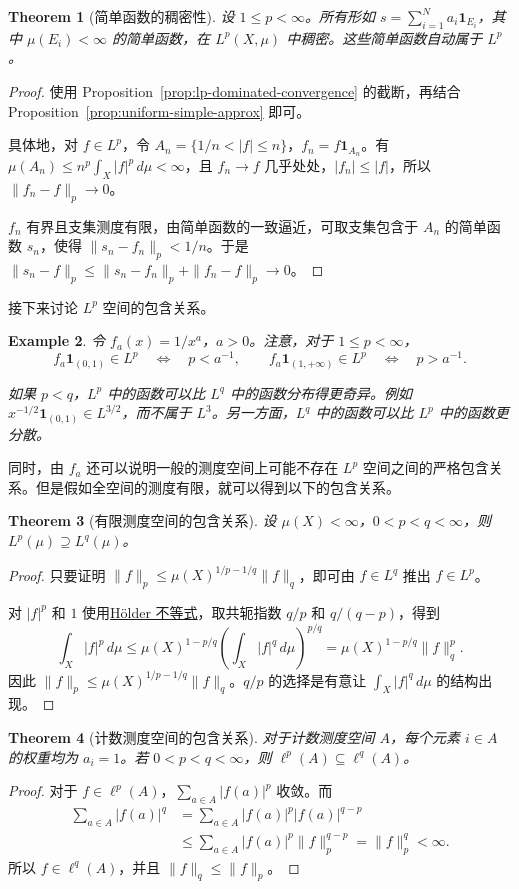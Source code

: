 \documentclass[12pt,letterpaper,twoside,openright]{ctexbook}
\theoremstyle{bluehead}
\newtheorem{theorem}{Theorem}
\theoremstyle{olivehead}
\theoremstyle{orangehead}
\newtheorem{example}[theorem]{Example}
\theoremstyle{redremark}
\begin{document}
\begin{theorem}[简单函数的稠密性]\label{thm:simple-functions-lp-density}
设 $1\leq p<\infty$。所有形如 $s=\sum_{i=1}^Na_i\mathbf1_{E_i}$，其中 $\mu(E_i)<\infty$ 的简单函数，在 $L^p(X,\mu)$ 中稠密。这些简单函数自动属于 $L^p$。
\end{theorem}
\begin{proof}
使用 Proposition~\ref{prop:lp-dominated-convergence} 的截断，再结合 Proposition~\ref{prop:uniform-simple-approx} 即可。

具体地，对 $f\in L^p$，令 $A_n=\{1/n<|f|\leq n\}$，$f_n=f\mathbf1_{A_n}$。有 $\mu(A_n)\leq n^p\int_X|f|^p\,d\mu<\infty$，且 $f_n\to f$ 几乎处处，$|f_n|\leq|f|$，所以 $\|f_n-f\|_p\to0$。

$f_n$ 有界且支集测度有限，由简单函数的一致逼近，可取支集包含于 $A_n$ 的简单函数 $s_n$，使得 $\|s_n-f_n\|_p<1/n$。于是 $\|s_n-f\|_p\leq\|s_n-f_n\|_p+\|f_n-f\|_p\to0$。
\end{proof}

\noindent 接下来讨论 $L^p$ 空间的包含关系。
\begin{example}
令 $f_a(x)=1/x^a$，$a>0$。注意，对于 $1\leq p<\infty$，
\[
f_a\mathbf1_{(0,1)}\in L^p
\quad\Longleftrightarrow\quad p<a^{-1},
\qquad
f_a\mathbf1_{(1,+\infty)}\in L^p
\quad\Longleftrightarrow\quad p>a^{-1}.
\]


如果 $p<q$，$L^p$ 中的函数可以比 $L^q$ 中的函数分布得更奇异。例如 $x^{-1/2}\mathbf1_{(0,1)}\in L^{3/2}$，而不属于 $L^3$。另一方面，$L^q$ 中的函数可以比 $L^p$ 中的函数更分散。
\end{example}
同时，由 $f_a$ 还可以说明一般的测度空间上可能不存在 $L^p$ 空间之间的严格包含关系。但是假如全空间的测度有限，就可以得到以下的包含关系。
\begin{theorem}[有限测度空间的包含关系]
设 $\mu(X)<\infty$，$0<p<q<\infty$，则 $L^p(\mu)\supseteq L^q(\mu)$。
\end{theorem}
\begin{proof}
只要证明 $\|f\|_p\leq\mu(X)^{1/p-1/q}\|f\|_q$，即可由 $f\in L^q$ 推出 $f\in L^p$。

对 $|f|^p$ 和 $1$ 使用\hyperref[thm:holder-lp]{Hölder 不等式}，取共轭指数 $q/p$ 和 $q/(q-p)$，得到
\[
\int_X|f|^p\,d\mu
\leq\mu(X)^{1-p/q}\left(\int_X|f|^q\,d\mu\right)^{p/q}
=\mu(X)^{1-p/q}\|f\|_q^p.
\]
因此 $\|f\|_p\leq\mu(X)^{1/p-1/q}\|f\|_q$。$q/p$ 的选择是有意让 $\int_X|f|^q\,d\mu$ 的结构出现。
\end{proof}

\begin{theorem}[计数测度空间的包含关系]
对于计数测度空间 $A$，每个元素 $i\in A$ 的权重均为 $a_i=1$。若 $0<p<q<\infty$，则 $\ell^p(A)\subseteq\ell^q(A)$。
\end{theorem}
\begin{proof}
对于 $f\in\ell^p(A)$，$\sum_{a\in A}|f(a)|^p$ 收敛。而
\[
\begin{aligned}
\sum_{a\in A}|f(a)|^q
&=\sum_{a\in A}|f(a)|^p|f(a)|^{q-p}\\
&\leq\sum_{a\in A}|f(a)|^p\|f\|_p^{q-p}
=\|f\|_p^q<\infty.
\end{aligned}
\]
所以 $f\in\ell^q(A)$，并且 $\|f\|_q\leq\|f\|_p$。
\end{proof}
\end{document}
